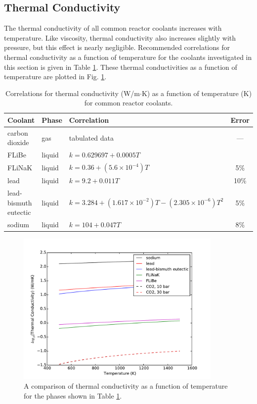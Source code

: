 \documentclass[10pt]{article}
\numberwithin{equation}{section} %
\begin{document}
\subsection{Thermal Conductivity}

The thermal conductivity of all common reactor coolants increases with temperature. Like viscosity, thermal conductivity also increases slightly with pressure, but this effect is nearly negligible. Recommended correlations for thermal conductivity as a function of temperature for the coolants investigated in this section is given in Table \ref{table:ThermalConductivities}. These thermal conductivities as a function of temperature are plotted in Fig. \ref{fig:ThermalConductivities}.

\begin{table}[H]
\caption{Correlations for thermal conductivity (W/m\(\cdot\)K) as a function of temperature (K) for common reactor coolants.}
\centering
\begin{tabular}{l l l c}
\hline\hline
Coolant & Phase & Correlation & Error\\ [0.5ex]
\hline
carbon dioxide						& gas		& tabulated data									& ---\\
FLiBe \cite{saltproperties}				& liquid		& \(k=0.629697+0.0005T\)								& \\
FLiNaK \cite{saltproperties}			& liquid		& \(k=0.36+(5.6\times10^{-4})T\)							& 5\%\\
lead \cite{LMproperties}				& liquid		& \(k=9.2+0.011T\)									& 10\%\\
lead-bismuth eutectic \cite{LMproperties}	& liquid		& \(k=3.284+(1.617\times10^{-2})T-(2.305\times10^{-6})T^2\) 	& 5\%\\
sodium \cite{LMproperties}			& liquid 		& \(k=104+0.047T\) 									& 8\%\\
\hline
\end{tabular}
\label{table:ThermalConductivities}
\end{table}

\begin{figure}[H]
  \centering
  \includegraphics[width=10cm]{figures/ThermalConductivities.pdf}
  \caption{A comparison of thermal conductivity as a function of temperature for the phases shown in Table \ref{table:ThermalConductivities}.}
  \label{fig:ThermalConductivities}
\end{figure}
\end{document}
